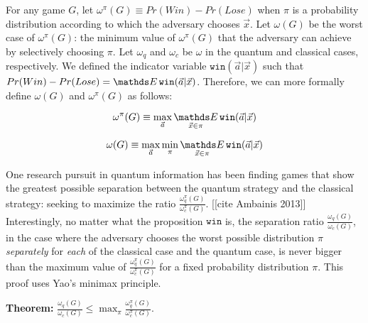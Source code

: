 For any game $G$, let $\omega^\pi(G) \equiv Pr(Win) - Pr(Lose)$ when $\pi$ is a probability distribution according to which the adversary chooses $\vec{x}$. Let $\omega(G)$ be the worst case of $\omega^\pi(G)$: the minimum value of $\omega^\pi(G)$ that the adversary can achieve by selectively choosing $\pi$. Let $\omega_q$ and $\omega_c$ be $\omega$ in the quantum and classical cases, respectively. We defined the indicator variable $\texttt{win}(\vec{a}|\vec{x})$ such that $Pr(Win) - Pr(Lose) = \Expected \texttt{win}(\vec{a}|\vec{x})$. Therefore, we can more formally define $\omega(G)$ and $\omega^\pi(G)$ as follows:

$$\omega^\pi(G) \equiv \max_{\vec{a}} \Expected_{\vec{x} \in \pi} \texttt{win}(\vec{a}|\vec{x})$$

$$\omega(G) \equiv \max_{\vec{a}} \min_\pi \Expected_{\vec{x} \in \pi} \texttt{win}(\vec{a}|\vec{x})$$

One research pursuit in quantum information has been finding games that show the greatest possible separation between the quantum strategy and the classical strategy: seeking to maximize the ratio $\frac{\omega_q^\pi(G)}{\omega_c^\pi(G)}$. [[cite Ambainis 2013]] Interestingly, no matter what the proposition $\texttt{win}$ is, the separation ratio $\frac{\omega_q(G)}{\omega_c(G)}$, in the case where the adversary chooses the worst possible distribution $\pi$ \emph{separately} for \emph{each} of the classical case and the quantum case, is never bigger than the maximum value of $\frac{\omega_q^\pi(G)}{\omega_c^\pi(G)}$ for a fixed probability distribution $\pi$. This proof uses Yao's minimax principle.

\textbf{Theorem:} $\frac{\omega_q(G)}{\omega_c(G)} \leq \max_\pi \frac{\omega_q^\pi(G)}{\omega_c^\pi(G)}$.

